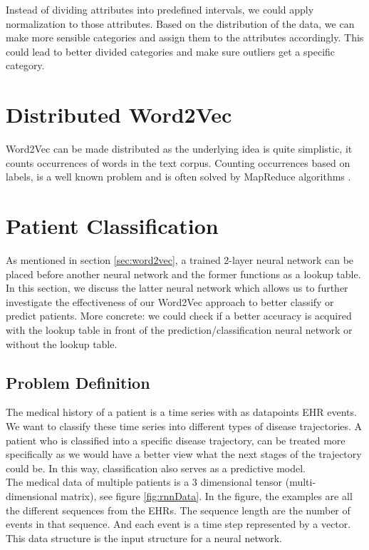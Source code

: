 Instead of dividing attributes into predefined intervals, we could apply normalization to those attributes. Based on the distribution of the data, we can make more sensible categories and assign them to the attributes accordingly. This could lead to better divided categories and make sure outliers get a specific category.


\section{Distributed Word2Vec}
\label{sec:distributed}

Word2Vec can be made distributed as the underlying idea is quite simplistic, it counts occurrences of words in the text corpus. Counting occurrences based on labels, is a well known problem and is often solved by MapReduce algorithms \cite{mapreduce:article}.


\section{Patient Classification}
\label{sec:PatientClassification}

As mentioned in section \ref{sec:word2vec}, a trained 2-layer neural network can be placed before another neural network and the former functions as a lookup table. In this section, we discuss the latter neural network which allows us to further investigate the effectiveness of our Word2Vec approach to better classify or predict patients. More concrete: we could check if a better accuracy is acquired with the lookup table in front of the prediction/classification neural network or without the lookup table. 

\subsection{Problem Definition}
\label{sec:problem}

The medical history of a patient is a time series with as datapoints EHR events. We want to classify these time series into different types of disease trajectories. A patient who is classified into a specific disease trajectory, can be treated more specifically as we would have a better view what the next stages of the trajectory could be. In this way, classification also serves as a predictive model. \\

The medical data of multiple patients is a $3$ dimensional tensor (multi-dimensional matrix), see figure \ref{fig:rnnData}. In the figure, the examples are all the different sequences from the EHRs. The sequence length are the number of events in that sequence. And each event is a time step represented by a vector. \\
This data structure is the input structure for a neural network. \\


